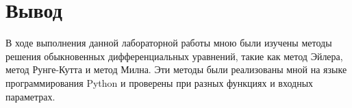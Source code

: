 \section{Вывод}
В ходе выполнения данной лабораторной работы мною были изучены
методы решения обыкновенных дифференциальных уравнений, такие как
метод Эйлера, метод Рунге-Кутта и метод Милна. Эти методы
были реализованы мной на языке программирования Python 
и проверены при разных функциях и входных параметрах.
